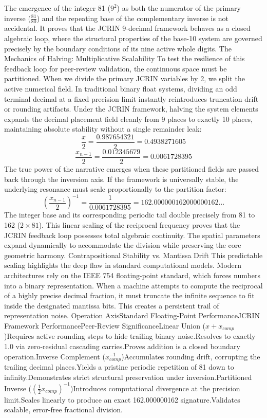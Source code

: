 The emergence of the integer 81 ($9^2$) as both the numerator of the primary inverse ($\frac{81}{80}$) and the repeating base of the complementary inverse is not accidental. It proves that the JCRIN 9-decimal framework behaves as a closed algebraic loop, where the structural properties of the base-10 system are governed precisely by the boundary conditions of its nine active whole digits.
The Mechanics of Halving: Multiplicative Scalability
To test the resilience of this feedback loop for peer-review validation, the continuous space must be partitioned. When we divide the primary JCRIN variables by 2, we split the active numerical field. In traditional binary float systems, dividing an odd terminal decimal at a fixed precision limit instantly reintroduces truncation drift or rounding artifacts.
Under the JCRIN framework, halving the system elements expands the decimal placement field cleanly from 9 places to exactly 10 places, maintaining absolute stability without a single remainder leak:
$$\frac{x}{2} = \frac{0.987654321}{2} = 0.4938271605$$ $$\frac{x_{n-1}}{2} = \frac{0.012345679}{2} = 0.0061728395$$ 
The true power of the narrative emerges when these partitioned fields are passed back through the inversion axis. If the framework is universally stable, the underlying resonance must scale proportionally to the partition factor:
$$\left(\frac{x_{n-1}}{2}\right)^{-1} = \frac{1}{0.0061728395} = 162.000000162000000162\dots$$ 
The integer base and its corresponding periodic tail double precisely from 81 to 162 ($2 \times 81$). This linear scaling of the reciprocal frequency proves that the JCRIN feedback loop possesses total algebraic continuity. The spatial parameters expand dynamically to accommodate the division while preserving the core geometric harmony.
Contrapositional Stability vs. Mantissa Drift
This predictable scaling highlights the deep flaw in standard computational models. Modern architectures rely on the IEEE 754 floating-point standard, which forces numbers into a binary representation. When a machine attempts to compute the reciprocal of a highly precise decimal fraction, it must truncate the infinite sequence to fit inside the designated mantissa bits. This creates a persistent trail of representation noise.
Operation AxisStandard Floating-Point PerformanceJCRIN Framework PerformancePeer-Review SignificanceLinear Union ($x + x_{comp}$)Requires active rounding steps to hide trailing binary noise.Resolves to exactly 1.0 via zero-residual cascading carries.Proves addition is a closed boundary operation.Inverse Complement ($x_{comp}^{-1}$)Accumulates rounding drift, corrupting the trailing decimal places.Yields a pristine periodic repetition of 81 down to infinity.Demonstrates strict structural preservation under inversion.Partitioned Inverse ($(\frac{1}{2}x_{comp})^{-1}$)Introduces computational divergence at the precision limit.Scales linearly to produce an exact 162.000000162 signature.Validates scalable, error-free fractional division.
